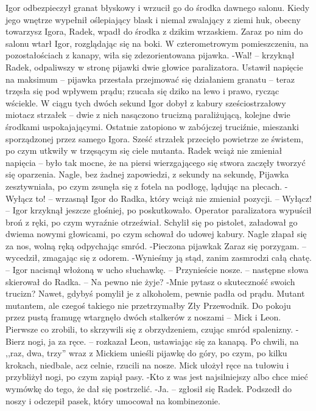 \documentclass[../MAIN.tex]{subfiles}
\begin{document}
Igor odbezpieczył granat błyskowy i wrzucił go do środka dawnego salonu. Kiedy jego wnętrze wypełnił oślepiający blask i niemal zwalający z ziemi huk, obecny towarzysz Igora, Radek, wpadł do środka z dzikim wrzaskiem. Zaraz po nim do salonu wtarł Igor, rozglądając się na boki.
W czterometrowym pomieszczeniu, na pozostałościach z kanapy, wiła się zdezorientowana pijawka.
-Wal! -- krzyknął Radek, odpaliwszy w stronę pijawki dwie głowice paralizatora. Ustawił napięcie na maksimum -- pijawka przestała przejmować się działaniem granatu -- teraz trzęsła się pod wpływem prądu; rzucała się dziko na lewo i prawo, rycząc wściekle. W ciągu tych dwóch sekund Igor dobył z kabury sześciostrzałowy miotacz strzałek -- dwie z nich nasączono trucizną paraliżującą, kolejne dwie środkami uspokajającymi. Ostatnie zatopiono w zabójczej truciźnie, mieszanki sporządzonej przez samego Igora.
Sześć strzałek przecięło powietrze ze świstem, po czym utkwiły w trzęsącym się ciele mutanta.
Radek wciąż nie zmieniał napięcia -- było tak mocne, że na piersi wierzgającego się stwora zaczęły tworzyć się oparzenia.
Nagle, bez żadnej zapowiedzi, z sekundy na sekundę, Pijawka zesztywniała, po czym zsunęła się z fotela na podłogę, lądując na plecach.
-Wyłącz to! -- wrzasnął Igor do Radka, który wciąż nie zmieniał pozycji. -- Wyłącz! -- Igor krzyknął jeszcze głośniej, po poskutkowało. Operator paralizatora wypuścił broń z ręki, po czym wyraźnie otrzeźwiał. Schylił się po pistolet, załadował go dwiema nowymi głowicami, po czym schował do udowej kabury. Nagle złapał się za nos, wolną ręką odpychając smród.
-Pieczona pijawka\3k Zaraz się porzygam. -- wycedził, zmagając się z odorem.
-Wynieśmy ją stąd, zanim zasmrodzi całą chatę. -- Igor nacisnął włożoną w ucho słuchawkę. -- Przynieście nosze. -- następne słowa skierował do Radka. -- Na pewno nie żyje?
-Mnie pytasz o skuteczność swoich trucizn? Nawet, gdybyś pomylił je z alkoholem, pewnie padła od prądu. Mutant mutantem, ale czegoś takiego nie przetrzymałby Zły Przewodnik.
Do pokoju przez pustą framugę wtargnęło dwóch stalkerów z noszami -- Mick i Leon. Pierwsze co zrobili, to skrzywili się z obrzydzeniem, czując smród spalenizny.
-Bierz nogi, ja za ręce. -- rozkazał Leon, ustawiając się za kanapą. Po chwili, na ,,raz, dwa, trzy'' wraz z Mickiem unieśli pijawkę do góry, po czym, po kilku krokach, niedbale, acz celnie, rzucili na nosze. Mick ułożył ręce na tułowiu i przybliżył nogi, po czym zapiął pasy.
-Kto z was jest najsilniejszy albo chce mieć wymówkę do tego, że dał się postrzelić.
-Ja. -- zgłosił się Radek. Podszedł do noszy i odczepił pasek, który umocował na kombinezonie.
\end{document}

